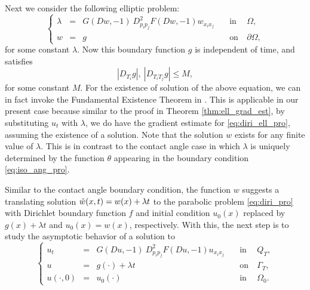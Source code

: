 \documentclass[12pt]{article}
\numberwithin{equation}{section}
\theoremstyle{plain}
\theoremstyle{definition}
\theoremstyle{remark}
\begin{document}
Next we consider the following elliptic problem: 
\begin{equation} 
\left\{ \begin{array}{cllcl}  \label{eq:diri_ell_pro}
     \lambda &=& G (Dw,-1) \ D^2_{p_i p_j} F (Dw,-1) w_{x_i x_j}   \quad & \text{in} & \ \Omega,  \\
     w &=& g \ \quad & \text{on} & \ \partial \Omega, 
\end{array} \right.
\end{equation}
for some constant $\lambda$.
Now this boundary function $g$ is independent of time, and satisfies
\begin{equation}
    |D_{T_i} g|,\ |D_{T_i T_j} g|   \leq M,
\end{equation} 
for some constant $M$. For the existence of solution of the above equation, we can in fact invoke the Fundamental Existence Theorem in \cite[Chapter 1, Section 1]{Se}. This is applicable in our present case because 
similar to the proof in Theorem \ref{thm:ell_grad_est}, by substituting $u_t$ with $\lambda$, we do have the gradient estimate for \eqref{eq:diri_ell_pro}, assuming the existence of a solution. 
Note        that the solution
$w$ exists for any finite value of $\lambda$. This is in contrast to the contact angle case in which $\lambda$ is uniquely determined by the function $\theta$ appearing in the boundary condition \eqref{eq:iso_ang_pro}.

Similar to the contact angle boundary condition, the function $w$ suggests a translating solution $\Tilde{w}(x,t) = w(x) + \lambda t$ to the parabolic problem 
\eqref{eq:diri_pro} with Dirichlet boundary function $f$ and initial condition $u_0(x)$ replaced by $g(x) + \lambda t$ and $u_0(x)=w(x)$, respectively.
With this, the next step is to study the asymptotic behavior of a solution to 
\begin{equation} \label{eq:diri_tran_pro}
    \left\{ \begin{array}{cllcl}
            u_t  &=& G(Du,-1) \  D^2_{p_i p_j} F (Du,-1) u_{x_i x_j}   \quad &  \text{in} & \ Q_T, \\
            u &=& g(\cdot) + \lambda t  \quad &  \text{on} & \ \Gamma_T,  \\
         u(\cdot,0) &=& u_0(\cdot)  \quad \ & \text{in} & \   \Omega_0.
    \end{array}  \right.
\end{equation}
\end{document}
